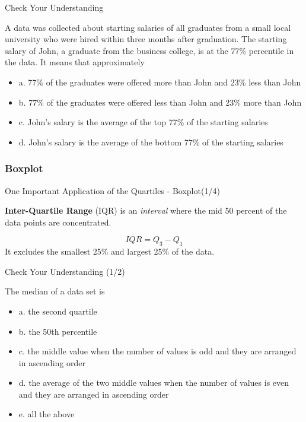 \documentclass{beamer}
\begin{document}
\begin{frame}{Check Your Understanding}

A data was collected about starting salaries of all graduates from a small local university who were hired within three months after graduation. The starting salary of John, a graduate from the business college, is at the 77\% percentile in the data. It means that approximately 

\begin{itemize}
\item a.	77\% of the graduates were offered more than John and 23\% less than John
\item b.	77\% of the graduates were offered less than John and 23\% more than John
\item c.	John’s salary is the average of the top 77\% of the starting salaries
\item d.	John’s salary is the average of the bottom 77\% of the starting salaries

\end{itemize}




\end{frame}





\subsubsection{Boxplot}
\begin{frame}{One Important Application of the Quartiles - Boxplot(1/4)}

\textbf{Inter-Quartile Range} (IQR) is an \textit{interval} where the mid 50 percent of the data points are concentrated.

$$IQR = Q_3 - Q_1$$
It excludes the smallest 25\% and largest 25\% of the data. 


\end{frame}


\begin{frame}{Check Your Understanding (1/2)}

The median of a data set is

\begin{itemize}
\item a.	the second quartile
\item b.	the 50th percentile
\item c.	the middle value when the number of values is odd and they are arranged in ascending order
\item d.	the average of the two middle values when the number of values is even and they are arranged in ascending order
\item e.	all the above

\end{itemize}

\end{frame}
\end{document}

